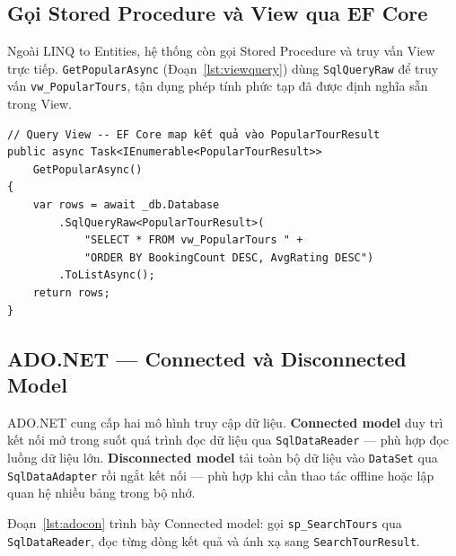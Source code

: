 \subsection{Gọi Stored Procedure và View qua EF Core}
  \label{sub3.4.3}

Ngoài LINQ to Entities, hệ thống còn gọi Stored Procedure
và truy vấn View trực tiếp. \texttt{GetPopularAsync}
(Đoạn~\ref{lst:viewquery}) dùng \texttt{SqlQueryRaw} để
truy vấn \texttt{vw\_PopularTours}, tận dụng phép tính phức
tạp đã được định nghĩa sẵn trong View.

\begin{lstlisting}[style=csharp,
  caption={Query vw\_PopularTours qua EF SqlQueryRaw},
  label={lst:viewquery}]
// Query View -- EF Core map kết quả vào PopularTourResult
public async Task<IEnumerable<PopularTourResult>>
    GetPopularAsync()
{
    var rows = await _db.Database
        .SqlQueryRaw<PopularTourResult>(
            "SELECT * FROM vw_PopularTours " +
            "ORDER BY BookingCount DESC, AvgRating DESC")
        .ToListAsync();
    return rows;
}
\end{lstlisting}

\subsection{ADO.NET — Connected và Disconnected Model}
  \label{sub3.4.4}

ADO.NET cung cấp hai mô hình truy cập dữ liệu. \textbf{Connected
model} duy trì kết nối mở trong suốt quá trình đọc dữ liệu qua
\texttt{SqlDataReader} — phù hợp đọc luồng dữ liệu lớn.
\textbf{Disconnected model} tải toàn bộ dữ liệu vào
\texttt{DataSet} qua \texttt{SqlDataAdapter} rồi ngắt kết nối
— phù hợp khi cần thao tác offline hoặc lập quan hệ nhiều bảng
trong bộ nhớ.

Đoạn~\ref{lst:adocon} trình bày Connected model: gọi
\texttt{sp\_SearchTours} qua \texttt{SqlDataReader}, đọc từng
dòng kết quả và ánh xạ sang \texttt{SearchTourResult}.

